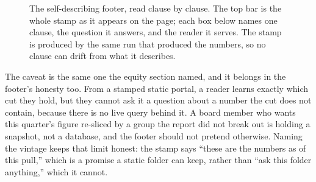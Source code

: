 \begin{figure}[htbp]
\centering
{}
\caption[Anatomy of a self-describing footer]{The self-describing footer, read clause by clause. The top bar is the whole stamp as it appears on the page; each box below names one clause, the question it answers, and the reader it serves. The stamp is produced by the same run that produced the numbers, so no clause can drift from what it describes.}
\label{fig:ch12-viz-footer}
\end{figure}

The caveat is the same one the equity section named, and it belongs in the footer's honesty too. From a stamped static portal, a reader learns exactly which cut they hold, but they cannot ask it a question about a number the cut does not contain, because there is no live query behind it. A board member who wants this quarter's figure re-sliced by a group the report did not break out is holding a snapshot, not a database, and the footer should not pretend otherwise. Naming the vintage keeps that limit honest: the stamp says \enquote{these are the numbers as of this pull,} which is a promise a static folder can keep, rather than \enquote{ask this folder anything,} which it cannot.

